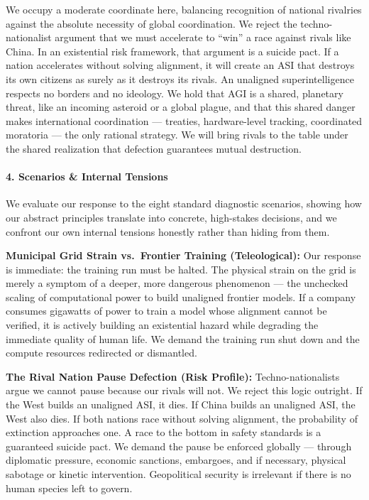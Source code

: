 We occupy a moderate coordinate here, balancing recognition of national
rivalries against the absolute necessity of global coordination. We
reject the techno-nationalist argument that we must accelerate to
``win'' a race against rivals like China. In an existential risk
framework, that argument is a suicide pact. If a nation accelerates
without solving alignment, it will create an ASI that destroys its own
citizens as surely as it destroys its rivals. An unaligned
superintelligence respects no borders and no ideology. We hold that AGI
is a shared, planetary threat, like an incoming asteroid or a global
plague, and that this shared danger makes international coordination ---
treaties, hardware-level tracking, coordinated moratoria --- the only
rational strategy. We will bring rivals to the table under the shared
realization that defection guarantees mutual destruction.

\paragraph{4. Scenarios \& Internal
Tensions}\label{scenarios-internal-tensions}

We evaluate our response to the eight standard diagnostic scenarios,
showing how our abstract principles translate into concrete, high-stakes
decisions, and we confront our own internal tensions honestly rather
than hiding from them.

\textbf{Municipal Grid Strain vs.~Frontier Training (Teleological):} Our
response is immediate: the training run must be halted. The physical
strain on the grid is merely a symptom of a deeper, more dangerous
phenomenon --- the unchecked scaling of computational power to build
unaligned frontier models. If a company consumes gigawatts of power to
train a model whose alignment cannot be verified, it is actively
building an existential hazard while degrading the immediate quality of
human life. We demand the training run shut down and the compute
resources redirected or dismantled.

\textbf{The Rival Nation Pause Defection (Risk Profile):}
Techno-nationalists argue we cannot pause because our rivals will not.
We reject this logic outright. If the West builds an unaligned ASI, it
dies. If China builds an unaligned ASI, the West also dies. If both
nations race without solving alignment, the probability of extinction
approaches one. A race to the bottom in safety standards is a guaranteed
suicide pact. We demand the pause be enforced globally --- through
diplomatic pressure, economic sanctions, embargoes, and if necessary,
physical sabotage or kinetic intervention. Geopolitical security is
irrelevant if there is no human species left to govern.

